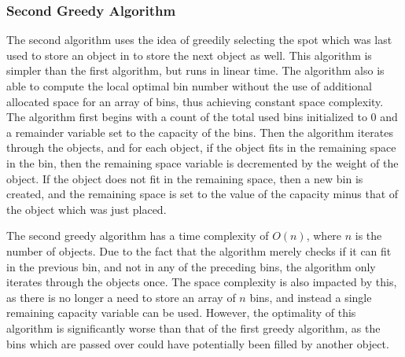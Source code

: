 \documentclass[11pt]{article}
\begin{document}
\begin{multicols}{2}
	\subsubsection{Second Greedy Algorithm}
	The second algorithm uses the idea of greedily selecting the spot which was last used to store an
	object in to store the next object as well. This algorithm is simpler than the first algorithm, but
	runs in linear time. The algorithm also is able to compute the local optimal bin number without the
	use of additional allocated space for an array of bins, thus achieving constant space complexity.
	The algorithm first begins with a count of the total used bins initialized to 0 and a remainder
	variable set to the capacity of the bins. Then the algorithm iterates through the objects, and for
	each object, if the object fits in the remaining space in the bin, then the remaining space variable
	is decremented by the weight of the object. If the object does not fit in the remaining space, then
	a new bin is created, and the remaining space is set to the value of the capacity minus that of the
	object which was just placed.

	\begin{algorithm}[H]
		\SetAlgoLined
		\SetStartEndCondition{ }{}{}%
		\AlgoDontDisplayBlockMarkers\SetAlgoNoEnd\SetAlgoNoLine%
		\caption{Greedy 2(${O}$, ${c}$, ${n}$)\label{greedy2}}
	\end{algorithm}

	The second greedy algorithm has a time complexity of ${O(n)}$, where ${n}$ is the number of objects.
	Due to the fact that the algorithm merely checks if it can fit in the previous bin, and not in any
	of the preceding bins, the algorithm only iterates through the objects once. The space complexity is
	also impacted by this, as there is no longer a need to store an array of ${n}$ bins, and instead a
	single remaining capacity variable can be used. However, the optimality of this algorithm is
	significantly worse than that of the first greedy algorithm, as the bins which are passed over could
	have potentially been filled by another object.


\end{multicols}
\end{document}
